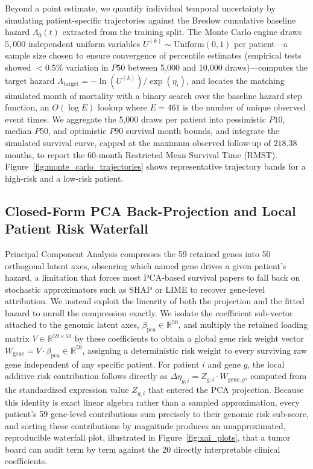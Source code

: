 \documentclass[sigconf, review=true]{acmart}
\begin{document}
Beyond a point estimate, we quantify individual temporal uncertainty by simulating patient-specific trajectories against the Breslow cumulative baseline hazard $\Lambda_0(t)$ extracted from the training split. The Monte Carlo engine draws $5{,}000$ independent uniform variables $U^{(k)} \sim \text{Uniform}(0, 1)$ per patient—a sample size chosen to ensure convergence of percentile estimates (empirical tests showed $< 0.5\%$ variation in $P50$ between 5,000 and 10,000 draws)—computes the target hazard $\Lambda_{\text{target}} = -\ln(U^{(k)}) / \exp(\eta_i)$, and locates the matching simulated month of mortality with a binary search over the baseline hazard step function, an $O(\log E)$ lookup where $E = 461$ is the number of unique observed event times. We aggregate the 5,000 draws per patient into pessimistic $P10$, median $P50$, and optimistic $P90$ survival month bounds, and integrate the simulated survival curve, capped at the maximum observed follow-up of $218.38$ months, to report the 60-month Restricted Mean Survival Time (RMST). Figure~\ref{fig:monte_carlo_trajectories} shows representative trajectory bands for a high-risk and a low-risk patient.

\subsection{Closed-Form PCA Back-Projection and Local Patient Risk Waterfall}
Principal Component Analysis compresses the 59 retained genes into 50 orthogonal latent axes, obscuring which named gene drives a given patient's hazard, a limitation that forces most PCA-based survival papers to fall back on stochastic approximators such as SHAP or LIME to recover gene-level attribution. We instead exploit the linearity of both the projection and the fitted hazard to unroll the compression exactly. We isolate the coefficient sub-vector attached to the genomic latent axes, $\beta_{\text{pca}} \in \mathbb{R}^{50}$, and multiply the retained loading matrix $V \in \mathbb{R}^{59 \times 50}$ by these coefficients to obtain a global gene risk weight vector $W_{\text{gene}} = V \cdot \beta_{\text{pca}} \in \mathbb{R}^{59}$, assigning a deterministic risk weight to every surviving raw gene independent of any specific patient. For patient $i$ and gene $g$, the local additive risk contribution follows directly as $\Delta \eta_{g,i} = Z_{g,i} \cdot W_{\text{gene},g}$, computed from the standardized expression value $Z_{g,i}$ that entered the PCA projection. Because this identity is exact linear algebra rather than a sampled approximation, every patient's 59 gene-level contributions sum precisely to their genomic risk sub-score, and sorting these contributions by magnitude produces an unapproximated, reproducible waterfall plot, illustrated in Figure~\ref{fig:xai_plots}, that a tumor board can audit term by term against the 20 directly interpretable clinical coefficients.
\end{document}
